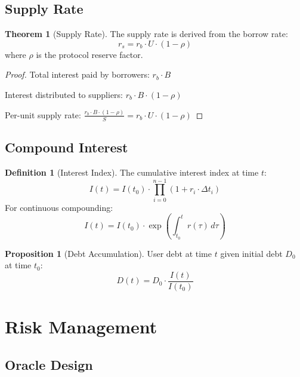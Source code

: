 \documentclass[11pt,a4paper]{article}
\theoremstyle{definition}
\newtheorem{definition}{Definition}
\newtheorem{theorem}{Theorem}
\newtheorem{proposition}{Proposition}
\begin{document}
\subsection{Supply Rate}

\begin{theorem}[Supply Rate]
The supply rate is derived from the borrow rate:
\begin{equation}
r_s = r_b \cdot U \cdot (1 - \rho)
\end{equation}
where $\rho$ is the protocol reserve factor.
\end{theorem}

\begin{proof}
Total interest paid by borrowers: $r_b \cdot B$

Interest distributed to suppliers: $r_b \cdot B \cdot (1 - \rho)$

Per-unit supply rate: $\frac{r_b \cdot B \cdot (1 - \rho)}{S} = r_b \cdot U \cdot (1 - \rho)$
\end{proof}

\subsection{Compound Interest}

\begin{definition}[Interest Index]
The cumulative interest index at time $t$:
\begin{equation}
I(t) = I(t_0) \cdot \prod_{i=0}^{n-1} (1 + r_i \cdot \Delta t_i)
\end{equation}
For continuous compounding:
\begin{equation}
I(t) = I(t_0) \cdot \exp\left(\int_{t_0}^{t} r(\tau) \, d\tau\right)
\end{equation}
\end{definition}

\begin{proposition}[Debt Accumulation]
User debt at time $t$ given initial debt $D_0$ at time $t_0$:
\begin{equation}
D(t) = D_0 \cdot \frac{I(t)}{I(t_0)}
\end{equation}
\end{proposition}

\section{Risk Management}

\subsection{Oracle Design}
\end{document}
